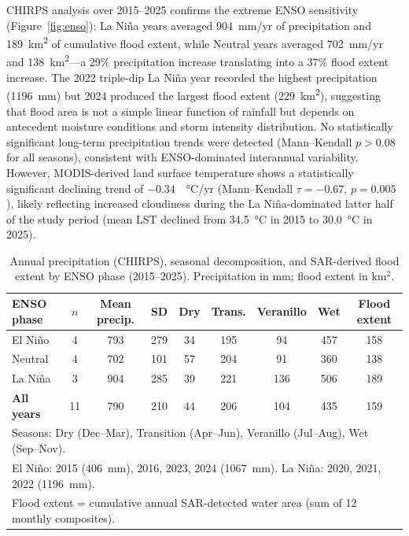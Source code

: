 \documentclass{article}
\begin{document}
CHIRPS analysis over 2015--2025 confirms the extreme ENSO sensitivity (Figure~\ref{fig:enso}): La Ni\~na years averaged \SI{904}{mm/yr} of precipitation and \SI{189}{\kilo\metre\squared} of cumulative flood extent, while Neutral years averaged \SI{702}{mm/yr} and \SI{138}{\kilo\metre\squared}---a 29\% precipitation increase translating into a 37\% flood extent increase. The 2022 triple-dip La Ni\~na year recorded the highest precipitation (\SI{1196}{mm}) but 2024 produced the largest flood extent (\SI{229}{\kilo\metre\squared}), suggesting that flood area is not a simple linear function of rainfall but depends on antecedent moisture conditions and storm intensity distribution. No statistically significant long-term precipitation trends were detected (Mann--Kendall $p > 0.08$ for all seasons), consistent with ENSO-dominated interannual variability. However, MODIS-derived land surface temperature shows a statistically significant declining trend of $-0.34$~\SI{}{\celsius/yr} (Mann--Kendall $\tau = -0.67$, $p = 0.005$), likely reflecting increased cloudiness during the La Ni\~na-dominated latter half of the study period (mean LST declined from \SI{34.5}{\celsius} in 2015 to \SI{30.0}{\celsius} in 2025).

\begin{table}[htbp]
\caption{Annual precipitation (CHIRPS), seasonal decomposition, and SAR-derived flood extent by ENSO phase (2015--2025). Precipitation in mm; flood extent in km$^2$.}
\label{tab:enso}
\centering
\footnotesize
\begin{tabular}{lcccccccc}
\toprule
\textbf{ENSO phase} & \textbf{$n$} & \textbf{Mean precip.} & \textbf{SD} & \textbf{Dry} & \textbf{Trans.} & \textbf{Veranillo} & \textbf{Wet} & \textbf{Flood extent} \\
\midrule
El Ni\~no  & 4 & 793 & 279 & 34 & 195 & 94 & 457 & 158 \\
Neutral    & 4 & 702 & 101 & 57 & 204 & 91 & 360 & 138 \\
La Ni\~na  & 3 & 904 & 285 & 39 & 221 & 136 & 506 & 189 \\
\midrule
\textbf{All years} & 11 & 790 & 210 & 44 & 206 & 104 & 435 & 159 \\
\bottomrule
\multicolumn{9}{l}{\scriptsize Seasons: Dry (Dec--Mar), Transition (Apr--Jun), Veranillo (Jul--Aug), Wet (Sep--Nov).}\\
\multicolumn{9}{l}{\scriptsize El Ni\~no: 2015 (\SI{406}{mm}), 2016, 2023, 2024 (\SI{1067}{mm}). La Ni\~na: 2020, 2021, 2022 (\SI{1196}{mm}).}\\
\multicolumn{9}{l}{\scriptsize Flood extent = cumulative annual SAR-detected water area (sum of 12 monthly composites).}
\end{tabular}
\end{table}
\end{document}
